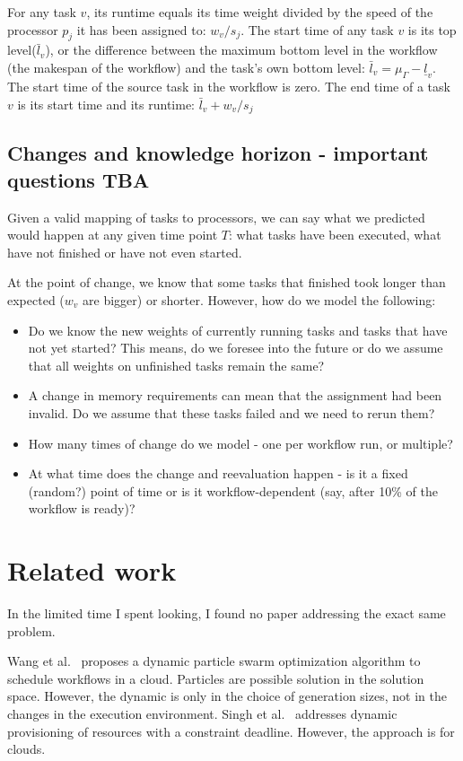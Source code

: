 \documentclass[sigconf,review,anonymous]{acmart}
\newcommand{\bottomlevel}[1]{\underline{l}_{#1}} %
\begin{document}
    For any task $v$, its runtime equals its time weight divided by the speed of the processor $p_j$ it has been assigned to: $w_v/s_j$.
    The start time of any task $v$ is its top level($\bar{l}_v$), or the difference between the maximum bottom level in the workflow (the makespan of the workflow) and the task's own bottom level: $\bar{l}_v = \mu_\Gamma - \bottomlevel{v}$.
    The start time of the source task in the workflow is zero.
    The end time of a task $v$ is its start time and its runtime: $\bar{l}_v + w_v/s_j$

    \subsection{Changes and knowledge horizon - important questions TBA}

    Given a valid mapping of tasks to processors, we can say what we predicted would happen at any given time point $T$: what tasks have been executed, what have not finished or have not even started.

    At the point of change, we know that some tasks that finished took longer than expected ($w_v$ are bigger) or shorter.
    However, how do we model the following:
    \begin{itemize}
        \item Do we know the new weights of currently running tasks and tasks that have not yet started? This means, do we foresee into the future or do we assume that all weights on unfinished tasks remain the same?
        \item A change in memory requirements can mean that the assignment had been invalid. Do we assume that these tasks failed and we need to rerun them?
        \item How many times of change do we model - one per workflow run, or multiple?
        \item At what time does the change and reevaluation happen - is it a fixed (random?) point of time or is it workflow-dependent (say, after 10\% of the workflow is ready)?
    \end{itemize}

    \section{Related work}

    In the limited time I spent looking, I found no paper addressing the exact same problem.

    Wang et al.~\cite{wang2019dynamic} proposes a dynamic particle swarm optimization algorithm to schedule workflows in a cloud.
    Particles are possible solution in the solution space.
    However, the dynamic is only in the choice of generation sizes, not in the changes in the execution environment.
    Singh et al.~\cite{singh2018novel} addresses dynamic provisioning of resources with a constraint deadline.
    However, the approach is for clouds.
    \xspace
\end{document}
